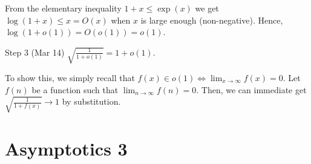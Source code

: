 \documentclass{article}[11px]
\begin{document}
From the elementary inequality \(1 + x \leq \exp(x)\) we get \(\log(1 + x) \leq x = O(x)\) when \(x\) is large enough (non-negative). Hence, \(\log(1 + o(1)) = O(o(1)) = o(1)\).

\begin{theorem}{\ok Step 3 (Mar 14)}{}
  \(\sqrt{\frac{1}{1 + o(1)}} = 1 + o(1)\).
\end{theorem}

To show this, we simply recall that \(f(x) \in o(1) \iff \lim_{x \to \infty} f(x) = 0\). Let \(f(n)\) be a function such that \(\lim_{n \to \infty} f(n) = 0\). Then, we can immediate get \(\sqrt{\frac{1}{1 + f(x)}} \to 1\) by substitution.

\pagebreak

\section{Asymptotics 3}\label{sec:asymptotics3}
\end{document}
